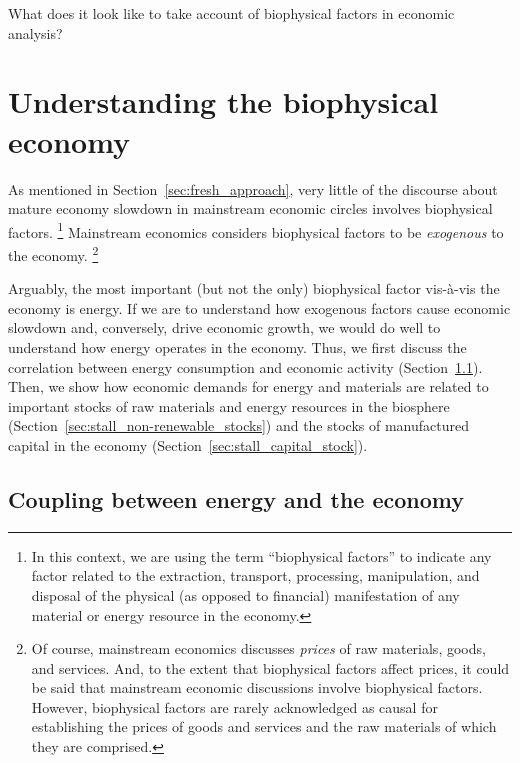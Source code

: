 What does it look like to take account of biophysical factors in economic analysis? 

\section{Understanding the biophysical economy}
\label{sec:exogenous_factors}

As mentioned in Section~\ref{sec:fresh_approach}, 
very little of the discourse 
about mature economy slowdown 
in mainstream economic circles
involves biophysical factors.%
	\footnote{
	In this context, we are using the term ``biophysical factors''
	to indicate any factor related to 
	the extraction, transport, processing, manipulation, and disposal 
	of the physical (as opposed to financial) manifestation 
	of any material or energy resource in the economy.
	}
Mainstream economics considers biophysical factors
to be \emph{exogenous} to the economy.%
	\footnote{
	Of course, mainstream economics discusses \emph{prices}
	of raw materials, goods, and services. 
	And, to the extent that biophysical factors affect prices,
	it could be said that mainstream economic discussions involve
	biophysical factors.
	However, biophysical factors are rarely acknowledged as causal 
	for establishing the prices of goods and services and the raw materials 
	of which they are comprised.
	}

Arguably, the most important (but not the only) biophysical factor 
vis-\`{a}-vis the economy is energy.
If we are to understand how exogenous factors cause economic slowdown
and, conversely, drive economic growth,
we would do well to understand how energy operates in the economy.
Thus, we first discuss the correlation 
between energy consumption and economic activity 
(Section~\ref{sec:energy-economy_coupling}).
Then, we show how economic demands for energy and materials
are related to important stocks 
of raw materials and energy resources in the biosphere 
(Section~\ref{sec:stall_non-renewable_stocks})
and the stocks of manufactured capital in the economy
(Section~\ref{sec:stall_capital_stock}).


\subsection{Coupling between energy and the economy}
\label{sec:energy-economy_coupling}

